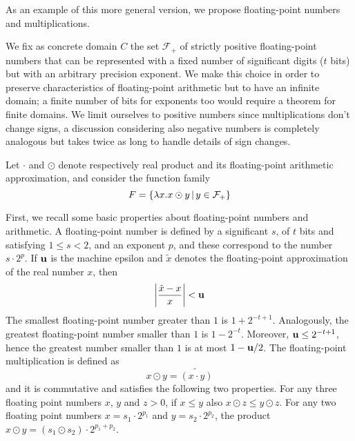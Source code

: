 As an example of this more general version, we propose floating-point numbers and multiplications.
\begin{example}\label{ch4:ex:fp-numbers-local}
	We fix as concrete domain $C$ the set $\mathcal{F_+}$ of strictly positive floating-point numbers that can be represented with a fixed number of significant digits ($t$ bits) but with an arbitrary precision exponent. We make this choice in order to preserve characteristics of floating-point arithmetic but to have an infinite domain; a finite number of bits for exponents too would require a theorem for finite domains. We limit ourselves to positive numbers since multiplications don't change signs, a discussion considering also negative numbers is completely analogous but takes twice as long to handle details of sign changes.

	Let $\cdot$ and $\odot$ denote respectively real product and its floating-point arithmetic approximation, and consider the function family
	\[
	F = \{ \lambda x . x \odot y \,\vert\, y \in \mathcal{F_+} \}
	\]

	First, we recall some basic properties about floating-point numbers and arithmetic. A floating-point number is defined by a significant $s$, of $t$ bits and satisfying $1 \le s < 2$, and an exponent $p$, and these correspond to the number $s \cdot 2^p$. If $\textbf{u}$ is the machine epsilon and $\tilde{x}$ denotes the floating-point approximation of the real number $x$, then
	\[
	\left\lvert \frac{\tilde{x} - x}{x} \right\rvert < \textbf{u}
	\]
	The smallest floating-point number greater than $1$ is $1 + 2^{-t+1}$. Analogously, the greatest floating-point number smaller than $1$ is $1 - 2^{-t}$. Moreover, $\textbf{u} \le 2^{-t+1}$, hence the greatest number smaller than $1$ is at most $1 - \textbf{u} / 2$.
	The floating-point multiplication is defined as
	\[
	x \odot y = \widetilde{(x \cdot y)}
	\]
	and it is commutative and satisfies the following two properties.
	For any three floating point numbers $x$, $y$ and $z > 0$, if $x \le y$ also $x \odot z \le y \odot z$.
	For any two floating point numbers $x = s_1 \cdot 2^{p_1}$ and $y = s_2 \cdot 2^{p_2}$, the product $x \odot y = (s_1 \odot s_2) \cdot 2^{p_1 + p_2}$.


\end{example}
